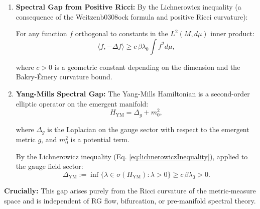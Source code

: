 \begin{theorem}
\begin{enumerate}
The Weitzenb0308ock formula states:
\begin{equation}
\Delta (|\nabla f|^2) = 2 \nabla^2 f \cdot \nabla f + 2 \mathrm{Ric}(\nabla f, \nabla f),
\end{equation}

or equivalently:
\begin{equation}
\square f = \Delta f - \frac{1}{n} (\nabla^2 f) \cdot f,
\end{equation}

relates the Laplacian to Ricci curvature.

\item \textbf{Spectral Gap from Positive Ricci:} By the Lichnerowicz inequality (a consequence of the Weitzenb0308ock formula and positive Ricci curvature):

For any function $f$ orthogonal to constants in the $L^2(M, d\mu)$ inner product:
\begin{equation}
\langle f, -\Delta f \rangle \geq c \, \beta \lambda_0 \int f^2 d\mu,
\label{eq:lichnerowiczInequality}
\end{equation}

where $c > 0$ is a geometric constant depending on the dimension and the Bakry-Émery curvature bound.

\item \textbf{Yang-Mills Spectral Gap:} The Yang-Mills Hamiltonian is a second-order elliptic operator on the emergent manifold:
\begin{equation}
H_{\text{YM}} = \Delta_g + m_0^2,
\end{equation}

where $\Delta_g$ is the Laplacian on the gauge sector with respect to the emergent metric $g$, and $m_0^2$ is a potential term.

By the Lichnerowicz inequality (Eq. \eqref{eq:lichnerowiczInequality}), applied to the gauge field sector:
\begin{equation}
\Delta_{\text{YM}} := \inf\{ \lambda \in \sigma(H_{\text{YM}}) : \lambda > 0 \} \geq c \, \beta \lambda_0 > 0.
\label{eq:ymGapM4Prime}
\end{equation}

\end{enumerate}

\textbf{Crucially:} This gap arises purely from the Ricci curvature of the metric-measure space and is independent of RG flow, bifurcation, or pre-manifold spectral theory.

\end{theorem}

